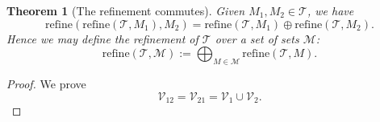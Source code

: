 \documentclass[a4paper,12pt,oneside,fleqn]{book}
\newtheorem{theorem}{Theorem}[section]
\theoremstyle{definition}
\theoremstyle{remark}
\begin{document}
\begin{theorem}[The refinement commutes]
	Given $M_1, M_2 \in \mathcal{T}$, we have
	\begin{equation}
		\text{refine}( \text{refine}(\mathcal{T}, M_1), M_2) = \text{refine}(\mathcal{T}, M_1) \oplus \text{refine}(\mathcal{T}, M_2).
	\end{equation}
	Hence we may define the refinement of $\mathcal{T}$ over a set of sets $\mathcal{M}$:
	\begin{equation}
		\text{refine}(\mathcal{T}, \mathcal{M}):= \bigoplus_{M \in \mathcal{M}} \text{refine}(\mathcal{T}, M). 
	\end{equation}
\end{theorem}
\begin{proof}
We prove
\begin{equation}
	\mathcal{V}_{12} = \mathcal{V}_{21} = \mathcal{V}_1 \cup \mathcal{V}_2.
\end{equation}
	
\end{proof}
\end{document}
